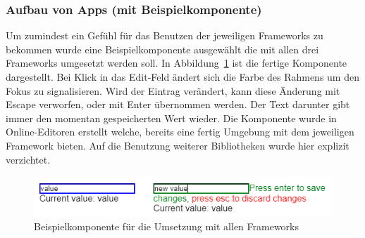 \subsubsection{Aufbau von Apps (mit Beispielkomponente)}
Um zumindest ein Gefühl für das Benutzen der jeweiligen Frameworks zu bekommen wurde eine Beispielkomponente ausgewählt die mit allen drei Frameworks umgesetzt werden soll. In Abbildung~\ref{fig:example_component} ist die fertige Komponente dargestellt. Bei Klick in das Edit-Feld ändert sich die Farbe des Rahmens um den Fokus zu signalisieren. Wird der Eintrag verändert, kann diese Änderung mit Escape verworfen, oder mit Enter übernommen werden. Der Text darunter gibt immer den momentan gespeicherten Wert wieder. Die Komponente wurde in Online-Editoren erstellt welche, bereits eine fertig Umgebung mit dem jeweiligen Framework bieten. Auf die Benutzung weiterer Bibliotheken wurde hier explizit verzichtet.

\begin{figure}
    \centering
    \captionsetup{justification=centering}
    \includegraphics{figures/example_component.png}
        \caption{Beispielkomponente für die Umsetzung mit allen Frameworks}\label{fig:example_component}
\end{figure}


